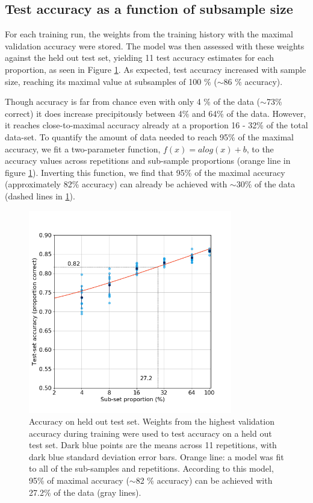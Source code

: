 \subsection{Test accuracy as a function of subsample size}

For each training run, the weights from the training history with the maximal
validation accuracy were stored. The model was then assessed with these weights
against the held out test set, yielding 11 test accuracy estimates for each
proportion, as seen in Figure \ref{fig_test}. As expected, test accuracy
increased with sample size, reaching its maximal value at subsamples of 100 \%
($\sim$86 \% accuracy).

Though accuracy is far from chance even with only 4 \% of the data ($\sim$73\%
correct) it does increase precipitously between 4\% and 64\% of the data.
However, it reaches close-to-maximal accuracy already at a proportion 16 - 32\%
of the total data-set. To quantify the amount of data needed to reach 95\% of
the maximal accuracy, we fit a two-parameter function, $f(x) = a log(x) + b$,
to the accuracy values across repetitions and sub-sample proportions (orange 
line in figure \ref{fig_test}). Inverting this function, we find that 95\% of 
the maximal accuracy (approximately 82\% accuracy) can already be achieved with 
$\sim30\%$ of the data (dashed lines in \ref{fig_test}).

\begin{figure}[!t]
\centering
\includegraphics[width=3.5in]{./figures/test}

\caption{Accuracy on held out test set. Weights from the highest validation
accuracy during training were used to test accuracy on a held out test set. Dark
blue points are the means across 11 repetitions, with dark blue standard
deviation error bars. Orange line: a model was fit to all of the sub-samples and 
repetitions. According to this model, 95\% of maximal accuracy
($\sim$82 \% accuracy) can be achieved with 27.2\% of the data (gray lines).}

\label{fig_test}
\end{figure}

